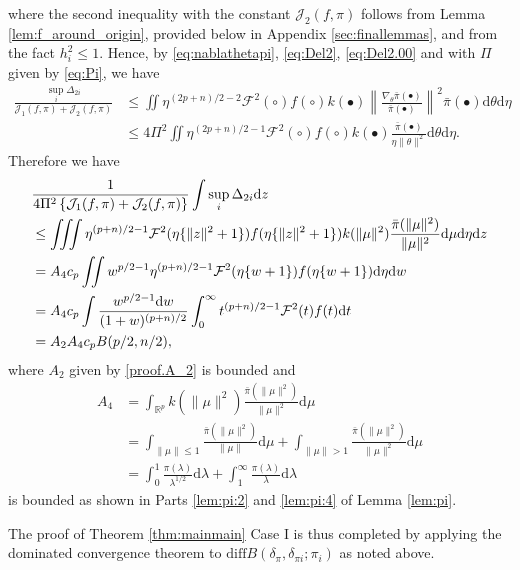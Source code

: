 \documentclass[preprint,11pt]{imsart}
\numberwithin{equation}{section}
\theoremstyle{plain}
\theoremstyle{definition}
\theoremstyle{remark}
\newcommand{\rd}{\mathrm{d}}
\newcommand{\ndiff}{\mathrm{diff}B}
\begin{document}
where the second inequality with the constant $\mathcal{J}_2(f,\pi)$ follows from Lemma \ref{lem:f_around_origin}, provided below in Appendix \ref{sec:finallemmas},
and from the fact $h_i^2\leq 1$.
Hence, by \eqref{eq:nablathetapi}, \eqref{eq:Del2}, \eqref{eq:Del2.00} and with
$\Pi$ 
given by \eqref{eq:Pi}, we have 
\begin{align*}
\frac{\sup_i\Delta_{2i}}{\mathcal{J}_1(f,\pi)+\mathcal{J}_2(f,\pi)}
 &\leq \iint   \eta^{(2p+n)/2-2} \mathcal{F}^2(\circ) f(\circ)
 k(\bullet)
 \left\|\frac{\nabla_\theta\bar{\pi}(\bullet)}{\bar{\pi}(\bullet)}\right\|^2
 \bar{\pi}(\bullet) \rd \theta   \rd \eta \\
 &\leq 4\Pi^2 \iint   \eta^{(2p+n)/2-1} \mathcal{F}^2(\circ) f(\circ)
 k(\bullet)\frac{\bar{\pi}(\bullet)}{\eta\|\theta\|^2} \rd \theta   \rd \eta. 
\end{align*}
Therefore we have
\begin{align}
 &\frac{1 }{4\Pi^2\left\{\mathcal{J}_1(f,\pi)+\mathcal{J}_2(f,\pi)\right\}}
 \int  \sup_i\Delta_{2i}\rd z \notag \\
 &\leq
 \iiint   \eta^{(p+n)/2-1} \mathcal{F}^2(\eta\{\|z\|^2+1\})
 f(\eta\{\|z\|^2+1\}) 
k(\|\mu\|^2)\frac{\bar{\pi}(\|\mu\|^2)}{\|\mu\|^2} \rd \mu   \rd \eta  \rd z \notag \\
 &=
 A_4c_p \iint  w^{p/2-1} \eta^{(p+n)/2-1} \mathcal{F}^2(\eta\{w+1\})f(\eta\{w+1\})
   \rd \eta  \rd w \label{eq:last.sec:subsub2} \\
 &=
 A_4c_p \int  \frac{w^{p/2-1} \rd w}{(1+w)^{(p+n)/2}}\int_0^\infty t^{(p+n)/2-1}\mathcal{F}^2(t)f(t) \rd t \notag\\
 &=
 A_2A_4 c_p B (p/2,n/2), \notag 
\end{align}
where $A_2$ given by \eqref{proof.A_2} is bounded and
\begin{align*}
 A_4&=\int_{\mathbb{R}^p} k(\|\mu\|^2)\frac{\bar{\pi}(\|\mu\|^2)}{\|\mu\|^2} \rd \mu \\
 &=\int_{\|\mu\|\leq 1} \frac{\bar{\pi}(\|\mu\|^2)}{\|\mu\|} \rd \mu
 +\int_{\|\mu\|> 1} \frac{\bar{\pi}(\|\mu\|^2)}{\|\mu\|^2} \rd \mu \\
 &=\int_0^1 \frac{\pi(\lambda)}{\lambda^{1/2}} \rd \lambda
+ \int_1^\infty \frac{\pi(\lambda)}{\lambda} \rd \lambda
\end{align*}
is bounded as shown in Parts \ref{lem:pi:2} and \ref{lem:pi:4} of Lemma \ref{lem:pi}.

The proof of Theorem \ref{thm:mainmain} Case I is thus completed by applying the dominated convergence
theorem to $\ndiff(\delta_\pi,\delta_{\pi i};\pi_i)$ as noted above.
\end{document}
